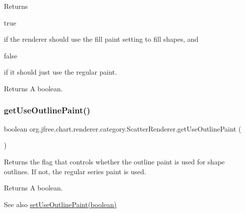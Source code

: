 Returns
\begin{DoxyCode}
\textcolor{keyword}{true} 
\end{DoxyCode}
 if the renderer should use the fill paint setting to fill shapes, and
\begin{DoxyCode}
\textcolor{keyword}{false} 
\end{DoxyCode}
 if it should just use the regular paint.

\begin{DoxyReturn}{Returns}
A boolean. 
\end{DoxyReturn}
\mbox{\label{classorg_1_1jfree_1_1chart_1_1renderer_1_1category_1_1_scatter_renderer_a4aab32236d2b3e1ffc9e3165a2789500}} 
\subsubsection{\texorpdfstring{get\+Use\+Outline\+Paint()}{getUseOutlinePaint()}}
{\footnotesize\ttfamily boolean org.\+jfree.\+chart.\+renderer.\+category.\+Scatter\+Renderer.\+get\+Use\+Outline\+Paint (\begin{DoxyParamCaption}{ }\end{DoxyParamCaption})}

Returns the flag that controls whether the outline paint is used for shape outlines. If not, the regular series paint is used.

\begin{DoxyReturn}{Returns}
A boolean.
\end{DoxyReturn}
\begin{DoxySeeAlso}{See also}
\mbox{\hyperlink{classorg_1_1jfree_1_1chart_1_1renderer_1_1category_1_1_scatter_renderer_a12757d38eaca9521a3f7770a984cfc9b}{set\+Use\+Outline\+Paint(boolean)}} 
\end{DoxySeeAlso}
\mbox{\label{classorg_1_1jfree_1_1chart_1_1renderer_1_1category_1_1_scatter_renderer_a7ec61a84fcdf7910f9459b2e88261249}} 
